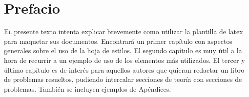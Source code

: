 \chapter*{Prefacio}
\pagestyle{especial}
{}

\lettrine[lraise=-0.1, lines=2, loversize=0.25]{E}{l} presente texto intenta explicar brevemente como utilizar la plantilla de latex para maquetar sus documentos. Encontrará un primer capítulo con aspectos generales sobre el uso de la hoja de estilos. El segundo capítulo es muy útil a la hora de recurrir a un ejemplo de uso de los elementos más utilizados. El tercer y último capítulo es de interés para aquellos autores que quieran redactar un libro de problemas resueltos, pudiendo intercalar secciones de teoría con secciones de problemas. También se incluyen ejemplos de Apéndices.

{}%